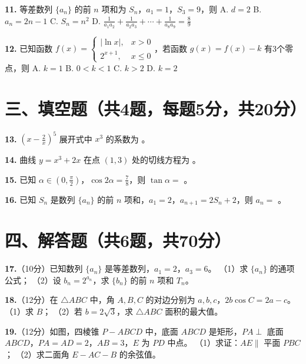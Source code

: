 \documentclass[12pt,a4paper]{ctexart}
\begin{document}
\textbf{11.} 等差数列 $\{a_n\}$ 的前 $n$ 项和为 $S_n$，$a_1=1$，$S_3=9$，则
\quad A. $d=2$ \quad B. $a_n=2n-1$ \quad C. $S_n=n^2$ \quad D. $\frac1{a_1a_2}+\frac1{a_2a_3}+\cdots+\frac1{a_8a_9}=\frac89$

\textbf{12.} 已知函数 $f(x)=\begin{cases} |\ln x|, & x>0 \\ 2^{x+1}, & x\le 0 \end{cases}$，若函数 $g(x)=f(x)-k$ 有3个零点，则
\quad A. $k=1$ \quad B. $0<k<1$ \quad C. $k>2$ \quad D. $k=2$

\section*{三、填空题（共4题，每题5分，共20分）}

\textbf{13.} $(x-\frac{2}{x})^5$ 展开式中 $x^3$ 的系数为 \underline{\hspace{2cm}}。

\textbf{14.} 曲线 $y=x^3+2x$ 在点 $(1,3)$ 处的切线方程为 \underline{\hspace{2cm}}。

\textbf{15.} 已知 $\alpha\in(0,\frac{\pi}{2})$，$\cos2\alpha=\frac78$，则 $\tan\alpha=$ \underline{\hspace{2cm}}。

\textbf{16.} 已知 $S_n$ 是数列 $\{a_n\}$ 的前 $n$ 项和，$a_1=2$，$a_{n+1}=2S_n+2$，则 $a_n=$ \underline{\hspace{2cm}}。

\newpage
\section*{四、解答题（共6题，共70分）}

\textbf{17.}（10分）已知数列 $\{a_n\}$ 是等差数列，$a_1=2$，$a_3=6$。
（1）求 $\{a_n\}$ 的通项公式；
（2）设 $b_n=2^{a_n}$，求 $\{b_n\}$ 的前 $n$ 项和 $T_n$。

\vspace{8cm}

\textbf{18.}（12分）在 $\triangle ABC$ 中，角 $A,B,C$ 的对边分别为 $a,b,c$，$2b\cos C=2a-c$。
（1）求 $B$；
（2）若 $b=2\sqrt3$，求 $\triangle ABC$ 面积的最大值。

\vspace{8cm}

\textbf{19.}（12分）如图，四棱锥 $P-ABCD$ 中，底面 $ABCD$ 是矩形，$PA\perp$ 底面 $ABCD$，$PA=AD=2$，$AB=3$，$E$ 为 $PD$ 中点。
（1）求证：$AE\parallel$ 平面 $PBC$；
（2）求二面角 $E-AC-B$ 的余弦值。
\end{document}
